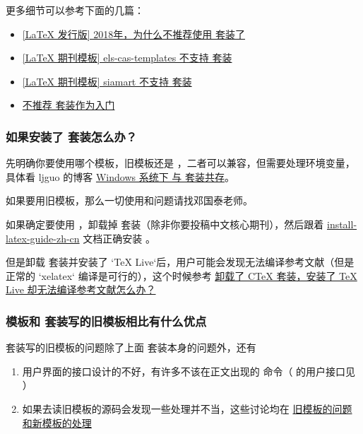 更多细节可以参考下面的几篇：

\begin{itemize}
  \item \href{https://zhuanlan.zhihu.com/p/45174503}{[LaTeX 发行版] 2018年，为什么不推荐使用 \CTeX 套装了}
  \item \href{https://zhuanlan.zhihu.com/p/73304856}{[LaTeX 期刊模板] els-cas-templates 不支持 \CTeX 套装}
  \item \href{https://zhuanlan.zhihu.com/p/112637535}{[LaTeX 期刊模板] siamart 不支持 \CTeX 套装}
  \item \href{https://tieba.baidu.com/p/2665622350}{不推荐 \CTeX 套装作为入门}
\end{itemize}


\subsubsection{如果安装了 \CTeX 套装怎么办？}

先明确你要使用哪个模板，旧模板还是 ，二者可以兼容，但需要处理环境变量，具体看 ljguo 的博客 \href{https://ljguo1020.github.io/2022/06/09/texlive-and-ctex/}{Windows 系统下 \TeXLive 与 \CTeX 套装共存}。

如果要用旧模板，那么一切使用和问题请找邓国泰老师。

如果确定要使用 ，卸载掉 \CTeX 套装（除非你要投稿中文核心期刊），然后跟着 \href{https://gitee.com/OsbertWang/install-latex-guide-zh-cn/releases}{install-latex-guide-zh-cn} 文档正确安装 \TeXLive 。


但是卸载 \CTeX 套装并安装了 `TeX Live`后，用户可能会发现无法编译参考文献（但是正常的 `xelatex` 编译是可行的），这个时候参考
\href{https://gitee.com/xkwxdyy/CCNUthesis/wikis/%E5%8D%B8%E8%BD%BD%E4%BA%86CTeX%E5%A5%97%E8%A3%85%E5%AE%89%E8%A3%85%E4%BA%86TeXLive%E5%8D%B4%E6%97%A0%E6%B3%95%E7%BC%96%E8%AF%91%E5%8F%82%E8%80%83%E6%96%87%E7%8C%AE}{卸载了 CTeX 套装，安装了 TeX Live 却无法编译参考文献怎么办？}


\subsubsection{ 模板和 \CTeX 套装写的旧模板相比有什么优点}

\CTeX 套装写的旧模板的问题除了上面 \CTeX 套装本身的问题外，还有
\begin{enumerate}
  \item 用户界面的接口设计的不好，有许多不该在正文出现的  命令（ 的用户接口见 ）
  \item 如果去读旧模板的源码会发现一些处理并不当，这些讨论均在 \href{https://gitee.com/xkwxdyy/CCNUthesis/wikis/%E6%97%A7%E6%A8%A1%E7%89%88%E7%9A%84%E9%97%AE%E9%A2%98%E5%92%8C%E6%96%B0%E6%A8%A1%E7%89%88%E7%9A%84%E5%A4%84%E7%90%86}{旧模板的问题和新模板的处理}
\end{enumerate}


